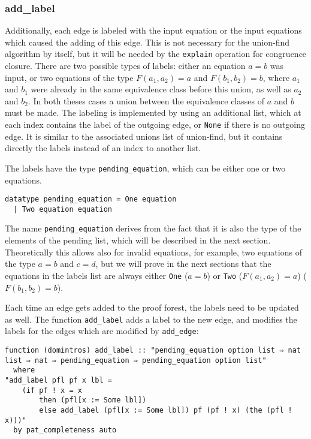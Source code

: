 \subsubsection{add\_label}

Additionally, each edge is labeled with the input equation or the input equations which caused the adding of this edge. This is not necessary for the union-find algorithm by itself, but it will be needed by the \lstinline{explain} operation for congruence closure. There are two possible types of labels: either an equation $a = b$ was input, or two equations of the type $F(a_1, a_2) = a$ and $F(b_1, b_2) = b$, where $a_1$ and $b_1$ were already in the same equivalence class before this union, as well as $a_2$ and $b_2$. In both theses cases a union between the equivalence classes of $a$ and $b$ must be made. The labeling is implemented by using an additional list, which at each index contains the label of the outgoing edge, or \lstinline{None} if there is no outgoing edge. It is similar to the associated unions list of union-find, but it contains directly the labels instead of an index to another list.

The labels have the type \lstinline{pending_equation}, which can be either one or two equations.

\begin{lstlisting}
datatype pending_equation = One equation
  | Two equation equation
\end{lstlisting}

The name \lstinline{pending_equation} derives from the fact that it is also the type of the elements of the pending list, which will be described in the next section. Theoretically this allows also for invalid equations, for example, two equations of the type $a = b$ and $c = d$, but we will prove in the next sections that the equations in the labels list are always either \lstinline{One} ($a = b$) or \lstinline{Two} ($F(a_1, a_2) = a$) ($F(b_1, b_2) = b$).

Each time an edge gets added to the proof forest, the labels need to be updated as well. The function \lstinline{add_label} adds a label to the new edge, and modifies the labels for the edges which are modified by \lstinline{add_edge}:

\begin{lstlisting}
function (domintros) add_label :: "pending_equation option list ⇒ nat list ⇒ nat ⇒ pending_equation ⇒ pending_equation option list"
  where
"add_label pfl pf x lbl =
    (if pf ! x = x
        then (pfl[x := Some lbl])
        else add_label (pfl[x := Some lbl]) pf (pf ! x) (the (pfl ! x)))"
  by pat_completeness auto
\end{lstlisting}

